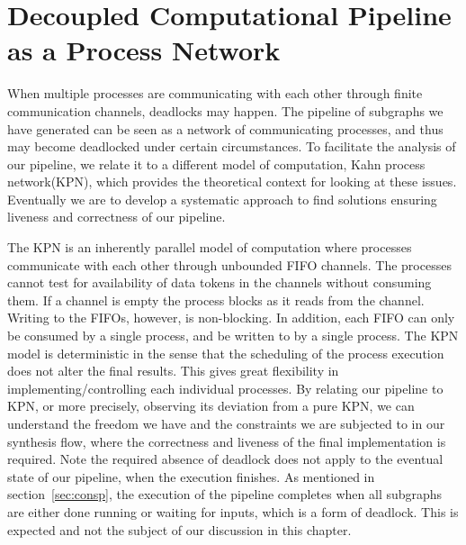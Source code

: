 
\chapter{Decoupled Computational Pipeline as a Process Network}
\label{liveprof}
When multiple processes are communicating with each other through finite communication channels, deadlocks may happen. The pipeline of subgraphs we have generated can be seen as a network
of communicating processes, and thus may become deadlocked under certain circumstances.
To facilitate the analysis of our pipeline, 
we relate it to a different model of computation, Kahn process network(KPN), which
provides the theoretical context for looking at these issues. Eventually we are to
develop a systematic approach to find solutions ensuring liveness and correctness of our pipeline.


The KPN is an inherently
parallel model of computation where processes communicate with
each other through unbounded FIFO channels. 
The processes cannot test for availability of data tokens in 
the channels without consuming them. If a channel is empty
the process blocks as it reads from the channel.
Writing to the FIFOs, however, is non-blocking.
In addition, each FIFO can only be consumed by a single process, and be written to by a single process. The KPN model is deterministic in the sense that the scheduling of
the process execution does not alter the final results. This gives great flexibility
in implementing/controlling each individual processes. 
By relating our pipeline to KPN, or more precisely, observing its deviation from a pure
KPN, we can understand the freedom we have and the constraints we are subjected
to in our synthesis flow, where the correctness and liveness of the final implementation is required. Note the required absence of deadlock does not
apply to the eventual state of our pipeline, when the execution finishes.
As mentioned in section~\ref{sec:consp}, the execution of the pipeline completes when all subgraphs are either done running or waiting for inputs, which is a form of deadlock. This is expected and not the subject of our discussion in this
chapter.




